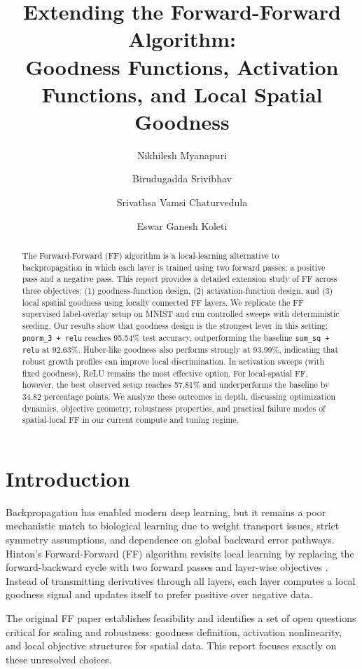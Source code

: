 \documentclass[sigconf]{acmart}
\title{Extending the Forward-Forward Algorithm:\\
Goodness Functions, Activation Functions, and Local Spatial Goodness}
\author{Nikhilesh Myanapuri}
\affiliation{%
  \institution{Project Team}
  \country{India}}
\author{Birudugadda Srivibhav}
\affiliation{%
  \institution{Project Team}
  \country{India}}
\author{Srivathsa Vamsi Chaturvedula}
\affiliation{%
  \institution{Project Team}
  \country{India}}
\author{Eswar Ganesh Koleti}
\affiliation{%
  \institution{Project Team}
  \country{India}}
\begin{document}
\begin{abstract}
The Forward-Forward (FF) algorithm is a local-learning alternative to backpropagation in which each layer is trained using two forward passes: a positive pass and a negative pass. This report provides a detailed extension study of FF across three objectives: (1) goodness-function design, (2) activation-function design, and (3) local spatial goodness using locally connected FF layers. We replicate the FF supervised label-overlay setup on MNIST and run controlled sweeps with deterministic seeding. Our results show that goodness design is the strongest lever in this setting: \texttt{pnorm\_3 + relu} reaches 95.54\% test accuracy, outperforming the baseline \texttt{sum\_sq + relu} at 92.63\%. Huber-like goodness also performs strongly at 93.99\%, indicating that robust growth profiles can improve local discrimination. In activation sweeps (with fixed goodness), ReLU remains the most effective option. For local-spatial FF, however, the best observed setup reaches 57.81\% and underperforms the baseline by 34.82 percentage points. We analyze these outcomes in depth, discussing optimization dynamics, objective geometry, robustness properties, and practical failure modes of spatial-local FF in our current compute and tuning regime.
\end{abstract}


\maketitle

\section{Introduction}
Backpropagation has enabled modern deep learning, but it remains a poor mechanistic match to biological learning due to weight transport issues, strict symmetry assumptions, and dependence on global backward error pathways. Hinton's Forward-Forward (FF) algorithm revisits local learning by replacing the forward-backward cycle with two forward passes and layer-wise objectives \cite{hinton2022ff}. Instead of transmitting derivatives through all layers, each layer computes a local goodness signal and updates itself to prefer positive over negative data.

The original FF paper establishes feasibility and identifies a set of open questions critical for scaling and robustness: goodness definition, activation nonlinearity, and local objective structures for spatial data. This report focuses exactly on these unresolved choices.
\end{document}
